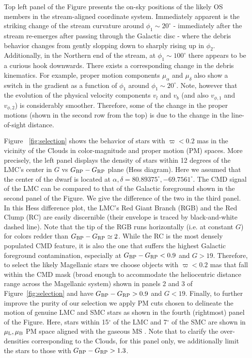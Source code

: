 \documentclass[a4paper,useAMS,usenatbib]{mnras}
\begin{document}
Top left panel of the Figure presents the on-sky positions of the
likely OS members in the stream-aligned coordinate system. Immediately
apparent is the striking change of the stream curvature around
$\phi_1\sim20^{\circ}$ - immediately after the stream re-emerges after
passing through the Galactic disc - where the debris behavior changes
from gently slopping down to sharply rising up in
$\phi_2$. Additionally, in the Northern end of the stream, at
$\phi_1\sim100^{\circ}$ there appears to be a curious hook
downwards. There exists a corresponding change in the debris
kinematics. For example, proper motion components $\mu_{\alpha}$ and
$\mu_{\delta}$ also show a switch in the gradient as a function of
$\phi_1$ around $\phi_1\sim20^{\circ}$. Note, however that the
evolution of the physical velocity components $v_l$ and $v_b$ (and
also $v_{\phi,1}$ and $v_{\phi,2}$) is considerably
smoother. Therefore, some of the change in the proper motions (shown
in the second row from the top) is due to the change in the
line-of-sight distance.

Figure ~\ref{fig:selection} shows the behavior of stars with
$\varpi<0.2$ mas in the vicinity of the Clouds in color-magnitude and
proper motion (PM) spaces. More precisely, the left panel displays the
density of stars within 12 degrees of the LMC's center in $G$ vs
$G_{\rm BP}-G_{\rm RP}$ plane (Hess diagram). Here we assumed that the
center of the dwarf is located at $\alpha, \delta =
80.89375^{\circ},-69.7561^{\circ}$. The CMD signal of the LMC can be
compared to that of the Galactic foreground shown in the second panel
of the Figure. We give the difference of the two in the third
panel. In this Hess difference plot, the LMC's Red Giant Branch (RGB)
and the Red Clump (RC) are easily discernible (their envelope is
traced by black-and-white dashed line). Note that the tip of the RGB
runs horizontally (i.e. at constant $G$) for colors redder than
$G_{\rm BP}-G_{\rm RP} \simeq 2$. While the RC is the most densely
populated CMD feature, it is also the one that suffers the highest
Galactic foreground contamination, especially at $G_{\rm BP}-G_{\rm
  RP}<0.9$ and $G>19$. Therefore, to select the likely Magellanic
stars we choose objects with $\varpi<0.2$ mas that fall within the CMD
mask (broad enough to accommodate the heliocentric distance range
across the Magellanic system) shown in panels 2 and 3 of
Figure~\ref{fig:selection} and have $G_{\rm BP}-G_{\rm RP}>0.9$ and
$G<19$. Finally, to further improve the purity of our selection we
apply PM cuts chosen to delineate the motion of genuine LMC and SMC
stars as shown in the fourth (rightmost) panel of the Figure. Here,
stars within 15$^{\circ}$ of the LMC and 7$^{\circ}$ of the SMC are
shown in $\mu_{\rm L}, \mu_{\rm B}$ PM space aligned with the gaseous
MS \citep[see][for the definition of the $L_{\rm MS}, B_{\rm MS}$
  coordinate system]{Nidever2008}. Note that to clarify the
over-densities corresponding to the Clouds, for this panel only, we
additionally limit the stars to those with $G_{\rm BP}-G_{\rm
  RP}>1.3$.
\end{document}
